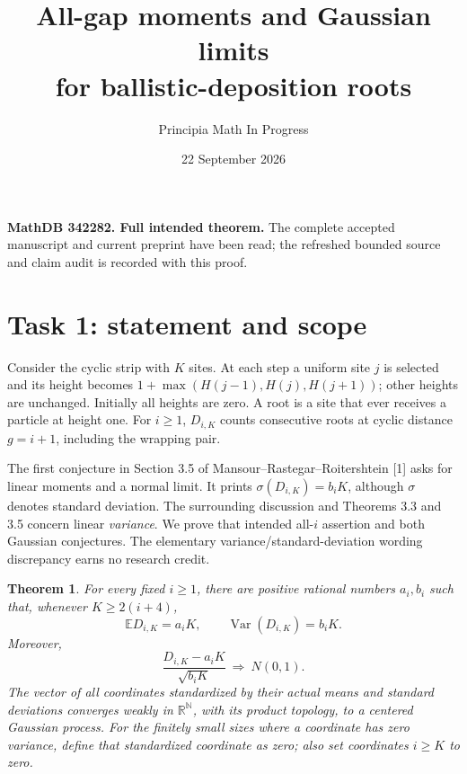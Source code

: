 \documentclass[11pt]{article}
\title{All-gap moments and Gaussian limits\\for ballistic-deposition roots}
\author{Principia Math In Progress}
\date{22 September 2026}
\newtheorem{theorem}{Theorem}
\newcommand{\E}{\mathbb E}
\newcommand{\Var}{\operatorname{Var}}
\newcommand{\N}{\mathbb N}
\newcommand{\R}{\mathbb R}
\begin{document}
\maketitle
\noindent\textbf{MathDB 342282. Full intended theorem.}
The complete accepted manuscript and current preprint have been read;
the refreshed bounded source and claim audit is recorded with this proof.

\section*{Task 1: statement and scope}
Consider the cyclic strip with \(K\) sites. At each step a uniform site
\(j\) is selected and its height becomes
\(1+\max(H(j-1),H(j),H(j+1))\); other heights are unchanged.
Initially all heights are zero. A root is a site that ever receives a
particle at height one. For \(i\geq1\), \(D_{i,K}\) counts consecutive
roots at cyclic distance \(g=i+1\), including the wrapping pair.

The first conjecture in Section 3.5 of Mansour--Rastegar--Roitershtein
[1] asks for linear moments and a normal limit. It prints
\(\sigma(D_{i,K})=b_iK\), although \(\sigma\) denotes standard deviation.
The surrounding discussion and Theorems 3.3 and 3.5 concern linear
\emph{variance}. We prove that intended all-\(i\) assertion and both
Gaussian conjectures. The elementary variance/standard-deviation
wording discrepancy earns no research credit.

\begin{theorem}
For every fixed \(i\geq1\), there are positive rational numbers \(a_i,b_i\)
such that, whenever \(K\geq2(i+4)\),
\[
 \E D_{i,K}=a_iK,\qquad \Var(D_{i,K})=b_iK.                 \tag{1}
\]
Moreover,
\[
 \frac{D_{i,K}-a_iK}{\sqrt{b_iK}}\ \Longrightarrow\ N(0,1).
                                                               \tag{2}
\]
The vector of all coordinates standardized by their actual means and
standard deviations converges weakly in
\(\R^{\N}\), with its product topology, to a centered Gaussian process.
For the finitely small sizes where a coordinate has zero variance,
define that standardized coordinate as zero; also set coordinates
\(i\geq K\) to zero.
\end{theorem}
\end{document}
